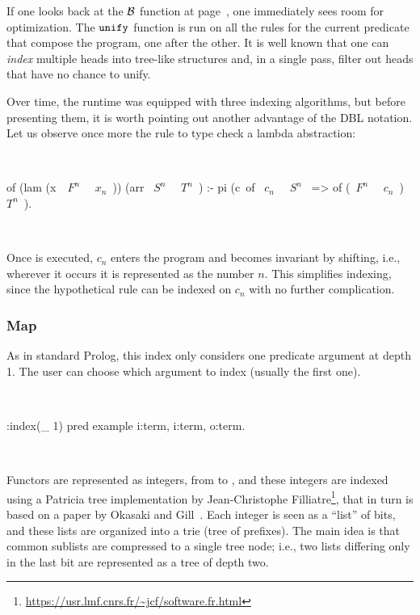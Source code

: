 \documentclass[a4paper, 11pt]{book}
\newenvironment{elpicode}
  {\VerbatimEnvironment~\\\begin{elpibox}\begin{xelpicode}}{\end{xelpicode}
\end{elpibox}\\}
\begin{document}
If one looks back at the $\mathcal{B}$ function at page~\pageref{backchain},
one immediately sees room for optimization. The $\texttt{unify}$ function is
run on all the rules for the current predicate that compose the program,
one after the other. It is well known that one can \emph{index} multiple heads
into tree-like structures and, in a single pass, filter out heads that have
no chance to unify.

Over time, the runtime was equipped with three indexing algorithms, but before
presenting them, it is worth pointing out another advantage of the DBL
notation. Let us observe once more the rule to type check a lambda abstraction:

\begin{elpicode}
of (lam (x\ ~$F^n$~ ~$x_n$~)) (arr ~$S^n$~ ~$T^n$~) :-
  pi (c\ of ~$c_n$~ ~$S^n$~ => of (~$F^n$~ ~$c_n$~) ~$T^n$~).
\end{elpicode}

\noindent
Once  is executed, $c_n$ enters the program and becomes invariant by
shifting, i.e., wherever it occurs it is represented as the number $n$. This
simplifies indexing, since the hypothetical rule 
can be indexed on $c_n$ with no further complication.

\subsubsection{Map}


As in standard Prolog, this index only considers one predicate argument at
depth 1. The user can choose which argument to index (usually the first one).

\begin{elpicode}
:index(_ 1) %
pred example i:term, i:term, o:term.
\end{elpicode}

\noindent
Functors are represented as integers, from  to , and
these integers are indexed using a Patricia tree implementation by
Jean-Christophe Filliatre\footnote{\url{https://usr.lmf.cnrs.fr/~jcf/software.fr.html}},
that in turn is based on a paper by Okasaki and Gill~\cite{Okasaki:98:IntMap}.
Each integer is
seen as a ``list'' of bits, and these lists are organized into a trie (tree of
prefixes). The main idea is that common sublists are compressed to a single
tree node; i.e., two lists differing only in the last bit are represented as a
tree of depth two.
\end{document}
